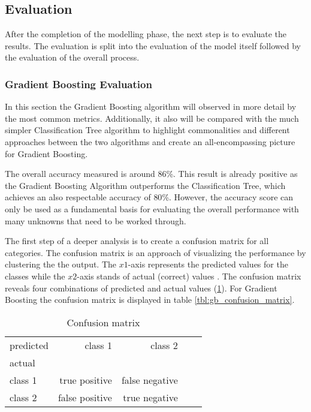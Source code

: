 \subsection{Evaluation}

After the completion of the modelling phase, the next step is to evaluate the results. The evaluation is split into 
the evaluation of the model itself followed by the evaluation of the overall process. 

\subsubsection{Gradient Boosting Evaluation}

In this section the Gradient Boosting algorithm will observed in more detail by the most common metrics. Additionally, it also
will be compared with the much simpler Classification Tree algorithm to highlight commonalities and different approaches between 
the two algorithms and create an all-encompassing picture for Gradient Boosting. 

The overall accuracy measured is around \(86\)\%. This result is already positive as the Gradient Boosting Algorithm outperforms 
the Classification Tree, which achieves an also respectable accuracy of \(80\)\%. However, the accuracy score can only be used as a
fundamental basis for evaluating the overall performance with many unknowns that need to be worked through.

The first step of a deeper analysis is to create a confusion matrix for all categories. The confusion matrix is an approach of 
visualizing the performance by clustering the the output. The \(x1\)-axis represents the predicted values for the classes 
while the \(x2\)-axis stands of actual (correct) values \cite[p.235]{Davis_2006}. The confusion matrix reveals four combinations of predicted 
and actual values (\ref{tbl:evaluation_confusion_matrix}). For Gradient Boosting the confusion matrix is displayed in table \ref{tbl:gb_confusion_matrix}.

\begin{table}[H]
  \centering
  \begin{tabular}{lrrrr}
    \toprule
    predicted & class 1         &  class 2          \\
    actual    &                 &                   \\
    \midrule
    class 1   &  true positive  &  false negative   \\
    class 2   &  false positive &  true negative    \\
    \bottomrule
    \end{tabular}
  \caption{Confusion matrix}%
  \label{tbl:evaluation_confusion_matrix}%
\end{table} 

